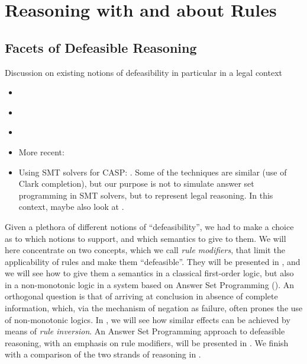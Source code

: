\section{Reasoning with and about Rules}\label{sec:resasoning_with_rules}


\subsection{Facets of Defeasible Reasoning}\label{sec:facets}

\begin{tcolorbox}[title=To be done]
Discussion on existing notions of defeasibility in particular in a legal context
\begin{itemize}
\item \cite{hart_concept_of_law_1997}
\item \cite{alchourron_makinson_hierarchies_of_regulations_1981}
\item \cite{hage_law_and_defeasibility_2003}
\item More recent: \cite{governatori21:_unrav_legal_refer_defeas_deont_logic}
\item Using SMT solvers for CASP:
  \cite{shen_lierler_smt_answer_set_kr_2018}. Some of the techniques are
  similar (use of Clark completion), but our purpose is not to simulate answer
  set programming in SMT solvers, but to represent legal reasoning. In this
  context, maybe also look at \cite{fages_consistency_clark_completion_1994}.
\end{itemize}
\end{tcolorbox}

Given a plethora of different notions of ``defeasibility'', we had to make a
choice as to which notions to support, and which semantics to give to them. We
will here concentrate on two concepts, which we call \emph{rule modifiers},
that limit the applicability of rules and make them ``defeasible''. They will
be presented in , and we will see how to give
them a semantics in a classical first-order logic, but also in a non-monotonic
logic in a system based on Answer Set Programming
(). An orthogonal question is that of
arriving at conclusion in absence of complete information, which, via the
mechanism of negation as  failure, often prones the use of
non-monotonic logics. In , we will see how similar
effects can be achieved by means of \emph{rule inversion}. An Answer Set
Programming approach to defeasible reasoning, with an emphasis on rule
modifiers, will be presented in . We finish
with a comparison of the two strands of reasoning in .


